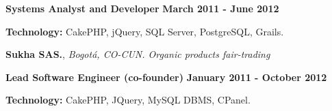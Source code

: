 \begin{outerlist}
\item[\FA \faAngleDoubleRight] \textbf{Systems Analyst and Developer} \hfill
\textbf{March 2011 - June 2012}
\end{outerlist}
% 
    \begin{innerlist}
\item \textbf{Technology:} CakePHP, jQuery, SQL Server, PostgreSQL, Grails.
    \end{innerlist}

\quarterblankline

\textbf{Sukha SAS.}, \textit{Bogot\'a, CO-CUN. Organic products fair-trading}

\begin{outerlist}
\item[\FA \faAngleDoubleRight] \textbf{Lead Software Engineer (co-founder)}
\hfill \textbf{January 2011 - October 2012}
\end{outerlist}

    \begin{innerlist}
\item \textbf{Technology:} CakePHP, JQuery, MySQL DBMS, CPanel.
    \end{innerlist}





%

